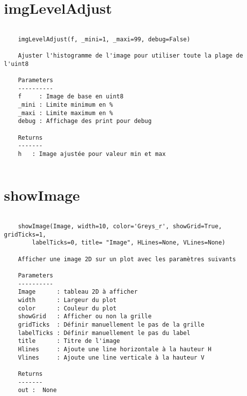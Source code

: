 \section{imgLevelAdjust}
\begin{lstlisting}[style=docstringstyle]

    imgLevelAdjust(f, _mini=1, _maxi=99, debug=False)
    
    Ajuster l'histogramme de l'image pour utiliser toute la plage de l'uint8
    
    Parameters
    ----------
    f     : Image de base en uint8
    _mini : Limite minimum en %
    _maxi : Limite maximum en %
    debug : Affichage des print pour debug

    Returns
    -------
    h   : Image ajustée pour valeur min et max
    
\end{lstlisting}
\section{showImage}
\begin{lstlisting}[style=docstringstyle]

    showImage(Image, width=10, color='Greys_r', showGrid=True, gridTicks=1, 
        labelTicks=0, title= "Image", HLines=None, VLines=None)
    
    Afficher une image 2D sur un plot avec les paramètres suivants
    
    Parameters
    ----------
    Image      : tableau 2D à afficher  
    width      : Largeur du plot
    color      : Couleur du plot   
    showGrid   : Afficher ou non la grille  
    gridTicks  : Définir manuellement le pas de la grille
    labelTicks : Définir manuellement le pas du label
    title      : Titre de l'image  
    Hlines     : Ajoute une line horizontale à la hauteur H
    Vlines     : Ajoute une line verticale à la hauteur V
      
    Returns
    -------
    out :  None
    
\end{lstlisting}

